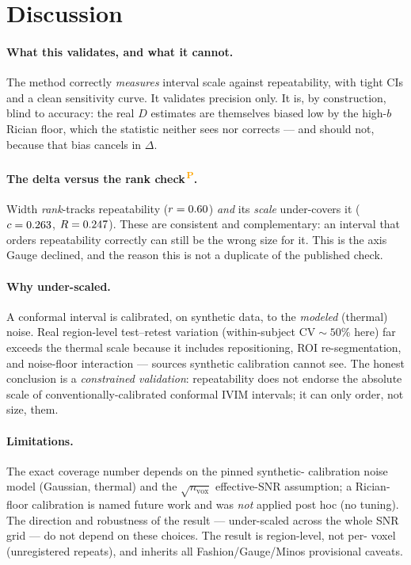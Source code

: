 \documentclass[11pt]{article}
\newcommand{\PROV}{\textsuperscript{\textcolor{orange}{\,P}}}
\begin{document}
\section{Discussion}\label{sec:disc}
\paragraph{What this validates, and what it cannot.} The method correctly \emph{measures}
interval scale against repeatability, with tight CIs and a clean sensitivity curve. It
validates precision only. It is, by construction, blind to accuracy: the real $D$ estimates
are themselves biased low by the high-$b$ Rician floor, which the statistic neither sees nor
corrects --- and should not, because that bias cancels in $\Delta$.

\paragraph{The delta versus the rank check\PROV{}.} Width \emph{rank}-tracks repeatability
($r=0.60$) \emph{and} its \emph{scale} under-covers it ($c=0.263$, $R=0.247$).
These are consistent and complementary: an interval that orders repeatability correctly can
still be the wrong size for it. This is the axis Gauge declined, and the reason this is not
a duplicate of the published check.

\paragraph{Why under-scaled.} A conformal interval is calibrated, on synthetic data, to the
\emph{modeled} (thermal) noise. Real region-level test--retest variation (within-subject
$\mathrm{CV}\sim 50\%$ here) far exceeds the thermal scale because it includes repositioning,
ROI re-segmentation, and noise-floor interaction --- sources synthetic calibration cannot
see. The honest conclusion is a \emph{constrained validation}: repeatability does not
endorse the absolute scale of conventionally-calibrated conformal IVIM intervals; it can
only order, not size, them.

\paragraph{Limitations.} The exact coverage number depends on the pinned synthetic-
calibration noise model (Gaussian, thermal) and the $\sqrt{n_{\mathrm{vox}}}$ effective-SNR
assumption; a Rician-floor calibration is named future work and was \emph{not} applied post
hoc (no tuning). The direction and robustness of the result --- under-scaled across the
whole SNR grid --- do not depend on these choices. The result is region-level, not per-
voxel (unregistered repeats), and inherits all Fashion/Gauge/Minos provisional caveats.
\end{document}
